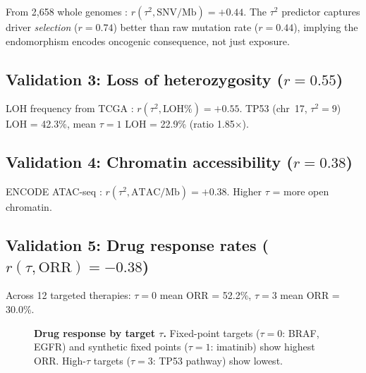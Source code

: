 \documentclass[11pt,a4paper]{article}
\begin{document}
From 2,658 whole genomes \citep{PCAWG2020}: $r(\tau^2, \text{SNV/Mb}) = +0.44$. The $\tau^2$ predictor captures driver \emph{selection} ($r = 0.74$) better than raw mutation rate ($r = 0.44$), implying the endomorphism encodes oncogenic consequence, not just exposure.

\subsection{Validation 3: Loss of heterozygosity ($r = 0.55$)}

LOH frequency from TCGA \citep{Taylor2018}: $r(\tau^2, \text{LOH\%}) = +0.55$. TP53 (chr~17, $\tau^2 = 9$) LOH = 42.3\%, mean $\tau = 1$ LOH = 22.9\% (ratio 1.85$\times$).

\subsection{Validation 4: Chromatin accessibility ($r = 0.38$)}

ENCODE ATAC-seq \citep{ENCODE2020}: $r(\tau^2, \text{ATAC/Mb}) = +0.38$. Higher $\tau$ = more open chromatin.

\subsection{Validation 5: Drug response rates ($r(\tau, \text{ORR}) = -0.38$)}

Across 12 targeted therapies: $\tau = 0$ mean ORR = 52.2\%, $\tau = 3$ mean ORR = 30.0\%.

\begin{figure}[h]
\centering
{}
\caption{\textbf{Drug response by target $\tau$.} Fixed-point targets ($\tau = 0$: BRAF, EGFR) and synthetic fixed points ($\tau = 1$: imatinib) show highest ORR. High-$\tau$ targets ($\tau = 3$: TP53 pathway) show lowest.}
\label{fig:drug_response}
\end{figure}
\end{document}
